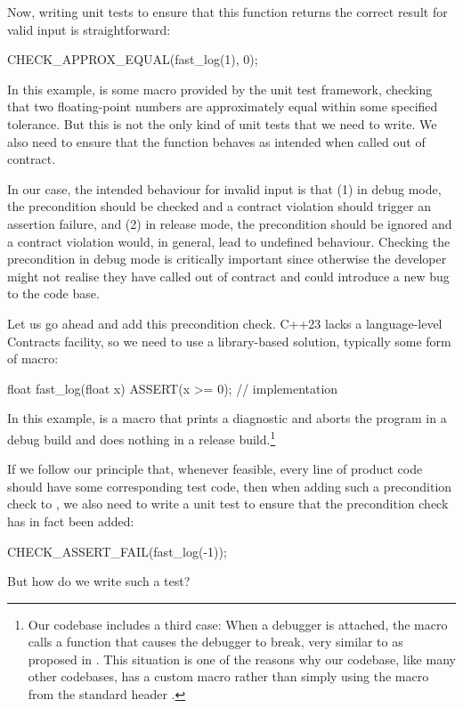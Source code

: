 Now, writing unit tests to ensure that this function returns the correct result for valid input is straightforward:
\begin{codeblock}
CHECK_APPROX_EQUAL(fast_log(1), 0);
\end{codeblock}
In this example,  is some macro provided by the unit test framework, checking that two floating-point numbers are approximately equal within some specified tolerance. But this is not the only kind of unit tests that we need to write. We also need to ensure that the function behaves as intended when called out of contract.

In our case, the intended behaviour for invalid input is that (1) in debug mode, the precondition  should be checked and a contract violation should trigger an assertion failure, and (2) in release mode, the precondition should be ignored and a contract violation would, in general, lead to undefined behaviour. Checking the precondition in debug mode is critically important since otherwise the developer might not realise they have called  out of contract and could introduce a new bug to the code base.

Let us go ahead and add this precondition check. C++23 lacks a language-level Contracts facility, so we need to use a library-based solution, typically some form of  macro: 
\begin{codeblock}
float fast_log(float x) {
  ASSERT(x >= 0);
  // implementation
}
\end{codeblock}
In this example,  is a macro that prints a diagnostic and aborts the program in a debug build and does nothing in a release build.\footnote{Our codebase includes a third case: When a debugger is attached, the macro calls a function that causes the debugger to break, very similar to  as proposed in \cite{P2514R0}. This situation is one of the reasons why our codebase, like many other codebases, has a custom  macro rather than simply using the  macro from the standard header .}

If we follow our principle that, whenever feasible, every line of product code should have some corresponding test code, then when adding such a precondition check to , we also need to write a unit test to ensure that the precondition check has in fact been added:
\begin{codeblock}
CHECK_ASSERT_FAIL(fast_log(-1));
\end{codeblock}
But how do we write such a test?

